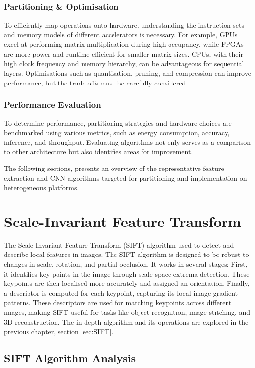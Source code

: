 \subsubsection{Partitioning \& Optimisation}
To efficiently map operations onto hardware, understanding the instruction sets and memory models of different accelerators is necessary. For example, GPUs excel at performing matrix multiplication during high occupancy, while FPGAs are more power and runtime efficient for smaller matrix sizes. CPUs, with their high clock frequency and memory hierarchy, can be advantageous for sequential layers. Optimisations such as quantisation, pruning, and compression can improve performance, but the trade-offs must be carefully considered.

\subsubsection{Performance Evaluation}
 To determine performance, partitioning strategies and hardware choices are benchmarked using various metrics, such as energy consumption, accuracy, inference, and throughput. Evaluating algorithms not only serves as a comparison to other architecture but also identifies areas for improvement.

The following sections, presents an overview of the representative feature extraction and CNN algorithms targeted for partitioning and implementation on heterogeneous platforms. 

\section{Scale-Invariant Feature Transform}
The Scale-Invariant Feature Transform (SIFT) algorithm used to detect and describe local features in images. The SIFT algorithm is designed to be robust to changes in scale, rotation, and partial occlusion. It works in several stages: First, it identifies key points in the image through scale-space extrema detection. These keypoints are then localised more accurately and assigned an orientation. Finally, a descriptor is computed for each keypoint, capturing its local image gradient patterns. These descriptors are used for matching keypoints across different images, making SIFT useful for tasks like object recognition, image stitching, and 3D reconstruction. The in-depth algorithm and its operations are explored in the previous chapter, section \ref{sec:SIFT}.

\subsection{SIFT Algorithm Analysis}

